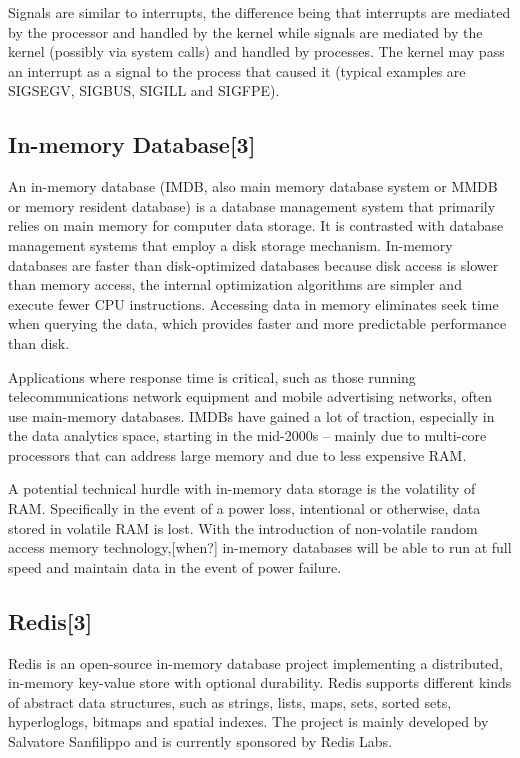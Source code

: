 \documentclass{article}
\begin{document}
			Signals are similar to interrupts, the difference being that interrupts are mediated by the processor and handled by the kernel while signals are mediated by the kernel (possibly via system calls) and handled by processes. The kernel may pass an interrupt as a signal to the process that caused it (typical examples are SIGSEGV, SIGBUS, SIGILL and SIGFPE).

		\subsection{In-memory Database[3]}
			An in-memory database (IMDB, also main memory database system or MMDB or memory resident database) is a database management system that primarily relies on main memory for computer data storage. It is contrasted with database management systems that employ a disk storage mechanism. In-memory databases are faster than disk-optimized databases because disk access is slower than memory access, the internal optimization algorithms are simpler and execute fewer CPU instructions. Accessing data in memory eliminates seek time when querying the data, which provides faster and more predictable performance than disk.

			Applications where response time is critical, such as those running telecommunications network equipment and mobile advertising networks, often use main-memory databases. IMDBs have gained a lot of traction, especially in the data analytics space, starting in the mid-2000s – mainly due to multi-core processors that can address large memory and due to less expensive RAM.

			A potential technical hurdle with in-memory data storage is the volatility of RAM. Specifically in the event of a power loss, intentional or otherwise, data stored in volatile RAM is lost. With the introduction of non-volatile random access memory technology,[when?] in-memory databases will be able to run at full speed and maintain data in the event of power failure.

		\subsection{Redis[3]}
			Redis is an open-source in-memory database project implementing a distributed, in-memory key-value store with optional durability. Redis supports different kinds of abstract data structures, such as strings, lists, maps, sets, sorted sets, hyperloglogs, bitmaps and spatial indexes. The project is mainly developed by Salvatore Sanfilippo and is currently sponsored by Redis Labs.
\end{document}
